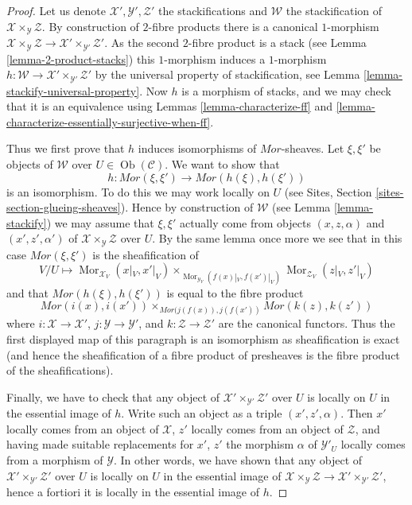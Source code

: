 \documentclass{stacks-project}
\theoremstyle{plain}
\theoremstyle{definition}
\theoremstyle{remark}
\numberwithin{equation}{subsection}
\def\Mor{\mathop{\mathrm{Mor}}\nolimits}
\def\Ob{\mathop{\mathrm{Ob}}\nolimits}
\begin{document}
\begin{proof}
Let us denote $\mathcal{X}', \mathcal{Y}', \mathcal{Z}'$ the stackifications
and $\mathcal{W}$ the stackification of
$\mathcal{X} \times_\mathcal{Y} \mathcal{Z}$. By construction of $2$-fibre
products there is a canonical $1$-morphism
$\mathcal{X} \times_\mathcal{Y} \mathcal{Z} \to
\mathcal{X}' \times_{\mathcal{Y}'} \mathcal{Z}'$.
As the second $2$-fibre product is a stack (see
Lemma \ref{lemma-2-product-stacks})
this $1$-morphism induces a $1$-morphism
$h : \mathcal{W} \to \mathcal{X}' \times_{\mathcal{Y}'} \mathcal{Z}'$
by the universal property of stackification, see
Lemma \ref{lemma-stackify-universal-property}.
Now $h$ is a morphism of stacks, and we may check that it is an
equivalence using
Lemmas \ref{lemma-characterize-ff} and
\ref{lemma-characterize-essentially-surjective-when-ff}.

\medskip\noindent
Thus we first prove that $h$ induces isomorphisms of $\mathit{Mor}$-sheaves.
Let $\xi, \xi'$ be objects of $\mathcal{W}$ over
$U \in \Ob(\mathcal{C})$. We want to show that
$$
h : \mathit{Mor}(\xi, \xi') \longrightarrow \mathit{Mor}(h(\xi), h(\xi'))
$$
is an isomorphism. To do this we may work locally on $U$ (see
Sites, Section \ref{sites-section-glueing-sheaves}).
Hence by construction of $\mathcal{W}$ (see
Lemma \ref{lemma-stackify})
we may assume that $\xi, \xi'$
actually come from objects $(x, z, \alpha)$ and $(x', z', \alpha')$
of $\mathcal{X} \times_\mathcal{Y} \mathcal{Z}$ over $U$.
By the same lemma once more we see that in this case
$\mathit{Mor}(\xi, \xi')$ is the sheafification of
$$
V/U \longmapsto
\Mor_{\mathcal{X}_V}(x|_V, x'|_V)
\times_{\Mor_{\mathcal{Y}_V}(f(x)|_V, f(x')|_V)}
\Mor_{\mathcal{Z}_V}(z|_V, z'|_V)
$$
and that $\mathit{Mor}(h(\xi), h(\xi'))$ is equal to the fibre product
$$
\mathit{Mor}(i(x), i(x'))
\times_{\mathit{Mor}(j(f(x)), j(f(x'))}
\mathit{Mor}(k(z), k(z'))
$$
where $i : \mathcal{X} \to \mathcal{X}'$,
$j : \mathcal{Y} \to \mathcal{Y}'$, and
$k : \mathcal{Z} \to \mathcal{Z}'$ are the canonical functors.
Thus the first displayed map of this paragraph is an isomorphism as
sheafification is exact (and hence the sheafification of a fibre product
of presheaves is the fibre product of the sheafifications).

\medskip\noindent
Finally, we have to check that any object of
$\mathcal{X}' \times_{\mathcal{Y}'} \mathcal{Z}'$
over $U$ is locally on $U$ in the essential image of $h$.
Write such an object as a triple $(x', z', \alpha)$.
Then $x'$ locally comes from an object of $\mathcal{X}$,
$z'$ locally comes from an object of $\mathcal{Z}$, and
having made suitable replacements for $x'$, $z'$ the morphism
$\alpha$ of $\mathcal{Y}'_U$ locally comes from a morphism of
$\mathcal{Y}$. In other words, we have shown that any object of
$\mathcal{X}' \times_{\mathcal{Y}'} \mathcal{Z}'$
over $U$ is locally on $U$ in the essential image of
$\mathcal{X} \times_\mathcal{Y} \mathcal{Z} \to
\mathcal{X}' \times_{\mathcal{Y}'} \mathcal{Z}'$, hence
a fortiori it is locally in the essential image of $h$.
\end{proof}
\end{document}
